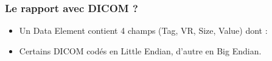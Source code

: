 \frame
{
    \frametitle{Le rapport avec DICOM ?}
    \begin{itemize}
        \item Un Data Element contient 4 champs (Tag, VR, Size, Value) dont :
        \item<5-> Certains DICOM cod\'es en Little Endian, d'autre en Big Endian. 
    \end{itemize}
}

